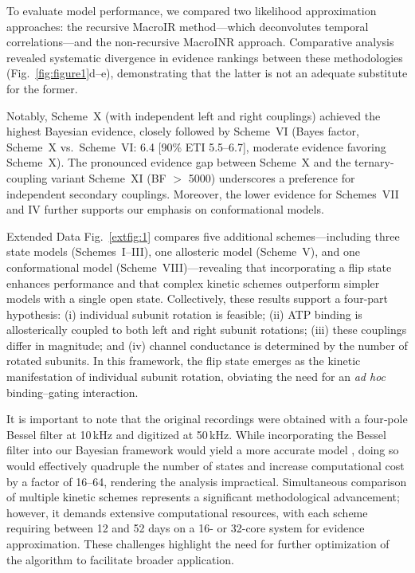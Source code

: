\documentclass[pdflatex,sn-nature]{sn-jnl}%
\begin{document}
To evaluate model performance, we compared two likelihood approximation approaches: the recursive MacroIR method—which deconvolutes temporal correlations—and the non-recursive MacroINR approach. Comparative analysis revealed systematic divergence in evidence rankings between these methodologies (Fig.~\ref{fig:figure1}d--e), demonstrating that the latter is not an adequate substitute for the former.

Notably, Scheme~X (with independent left and right couplings) achieved the highest Bayesian evidence, closely followed by Scheme~VI (Bayes factor, Scheme~X vs.~Scheme~VI: 6.4 [90\% ETI 5.5–6.7], moderate evidence favoring Scheme~X). The pronounced evidence gap between Scheme~X and the ternary-coupling variant Scheme~XI (BF $>$ 5000) underscores a preference for independent secondary couplings. Moreover, the lower evidence for Schemes~VII and IV further supports our emphasis on conformational models.

Extended Data Fig.~\ref{extfig:1} compares five additional schemes—including three state models (Schemes~I–III), one allosteric model (Scheme~V), and one conformational model (Scheme~VIII)—revealing that incorporating a flip state enhances performance and that complex kinetic schemes outperform simpler models with a single open state. Collectively, these results support a four-part hypothesis: (i) individual subunit rotation is feasible; (ii) ATP binding is allosterically coupled to both left and right subunit rotations; (iii) these couplings differ in magnitude; and (iv) channel conductance is determined by the number of rotated subunits. In this framework, the flip state emerges as the kinetic manifestation of individual subunit rotation, obviating the need for an {\it ad hoc} binding–gating interaction.

It is important to note that the original recordings were obtained with a four‐pole Bessel filter at 10\,kHz and digitized at 50\,kHz. While incorporating the Bessel filter into our Bayesian framework would yield a more accurate model \cite{QIN20001928}, doing so would effectively quadruple the number of states and increase computational cost by a factor of 16–64, rendering the analysis impractical. Simultaneous comparison of multiple kinetic schemes represents a significant methodological advancement; however, it demands extensive computational resources, with each scheme requiring between 12 and 52 days on a 16- or 32-core system for evidence approximation. These challenges highlight the need for further optimization of the algorithm to facilitate broader application.
\end{document}
